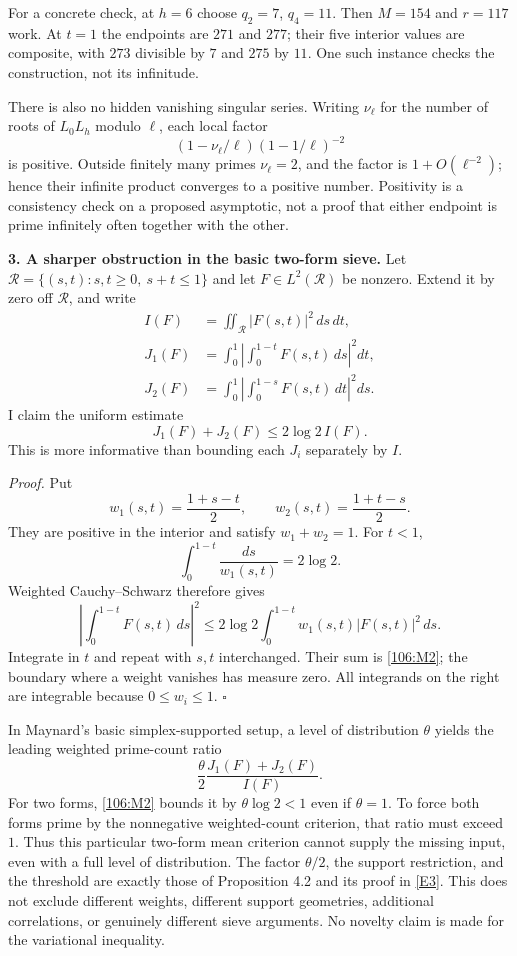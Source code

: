 \documentclass[11pt,a4paper]{article}
\newcommand{\eref}[2]{\hyperlink{extra:#1:#2}{[E#2]}}
\numberwithin{equation}{section}
\begin{document}
For a concrete check, at $h=6$ choose $q_2=7$, $q_4=11$. Then $M=154$ and
$r=117$ work. At $t=1$ the endpoints are $271$ and $277$; their five interior
values are composite, with $273$ divisible by $7$ and $275$ by $11$.
One such instance checks the construction, not its infinitude.

There is also no hidden vanishing singular series. Writing $\nu_\ell$ for
the number of roots of $L_0L_h$ modulo $\ell$, each local factor
\[
 (1-\nu_\ell/\ell)(1-1/\ell)^{-2}
\]
is positive. Outside finitely many primes $\nu_\ell=2$, and the factor is
$1+O(\ell^{-2})$; hence their infinite product converges to a positive
number. Positivity is a consistency check on a proposed asymptotic, not a
proof that either endpoint is prime infinitely often together with the other.

\medskip
\textbf{3. A sharper obstruction in the basic two-form sieve.}
Let $\mathcal R=\{(s,t):s,t\geq0,\ s+t\leq1\}$ and let $F\in L^2(\mathcal R)$
be nonzero. Extend it by zero off $\mathcal R$, and write
\begin{align*}
 I(F)&=\iint_{\mathcal R}|F(s,t)|^2\,ds\,dt,\\
 J_1(F)&=\int_0^1\left|\int_0^{1-t}F(s,t)\,ds\right|^2dt,\\
 J_2(F)&=\int_0^1\left|\int_0^{1-s}F(s,t)\,dt\right|^2ds.
\end{align*}
I claim the uniform estimate
\begin{equation}\label{106:M2}
 J_1(F)+J_2(F)\leq2\log2\,I(F).
\end{equation}
This is more informative than bounding each $J_i$ separately by $I$.

\emph{Proof.} Put
\[
 w_1(s,t)=\frac{1+s-t}{2},\qquad
 w_2(s,t)=\frac{1+t-s}{2}.
\]
They are positive in the interior and satisfy $w_1+w_2=1$. For $t<1$,
\[
 \int_0^{1-t}\frac{ds}{w_1(s,t)}=2\log2.
\]
Weighted Cauchy--Schwarz therefore gives
\[
 \left|\int_0^{1-t}F(s,t)\,ds\right|^2
 \leq2\log2\int_0^{1-t}w_1(s,t)|F(s,t)|^2\,ds.
\]
Integrate in $t$ and repeat with $s,t$ interchanged. Their sum is
\eqref{106:M2}; the boundary where a weight vanishes has measure zero.
All integrands on the right are integrable because $0\leq w_i\leq1$.
$\square$

In Maynard's basic simplex-supported setup, a level of distribution $\theta$
yields the leading weighted prime-count ratio
\[
 \frac{\theta}{2}\frac{J_1(F)+J_2(F)}{I(F)}.
\]
For two forms, \eqref{106:M2} bounds it by $\theta\log2<1$ even if
$\theta=1$. To force both forms prime by the nonnegative weighted-count
criterion, that ratio must exceed $1$. Thus this particular two-form mean
criterion cannot supply the missing input, even with a full level of
distribution. The factor $\theta/2$, the support restriction, and the
threshold are exactly those of Proposition 4.2 and its proof in
\eref{106}{3}. This does not exclude different weights, different support
geometries, additional correlations, or genuinely different sieve arguments.
No novelty claim is made for the variational inequality.
\end{document}
